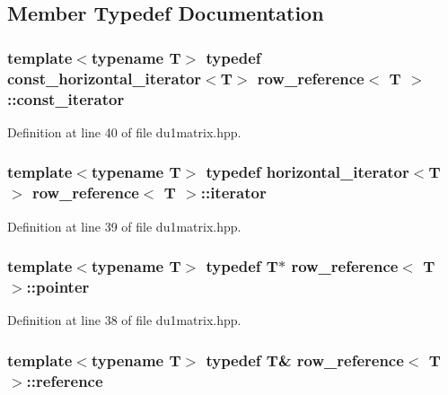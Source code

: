 \subsection{Member Typedef Documentation}
\hypertarget{classrow__reference_a3a005e2f998d46b3718fc09c79066b5e}{
\subsubsection[{const\-\_\-iterator}]{\setlength{\rightskip}{0pt plus 5cm}template$<$typename T$>$ typedef {\bf const\-\_\-horizontal\-\_\-iterator}$<$T$>$ {\bf row\-\_\-reference}$<$ T $>$\-::{\bf const\-\_\-iterator}}}\label{classrow__reference_a3a005e2f998d46b3718fc09c79066b5e}


Definition at line 40 of file du1matrix.\-hpp.

\hypertarget{classrow__reference_a82d976cea237ebb2ddb3be8bd810ffa8}{
\subsubsection[{iterator}]{\setlength{\rightskip}{0pt plus 5cm}template$<$typename T$>$ typedef {\bf horizontal\-\_\-iterator}$<$T$>$ {\bf row\-\_\-reference}$<$ T $>$\-::{\bf iterator}}}\label{classrow__reference_a82d976cea237ebb2ddb3be8bd810ffa8}


Definition at line 39 of file du1matrix.\-hpp.

\hypertarget{classrow__reference_a3f5e136cc45d10f628005e298ca0c724}{
\subsubsection[{pointer}]{\setlength{\rightskip}{0pt plus 5cm}template$<$typename T$>$ typedef T$\ast$ {\bf row\-\_\-reference}$<$ T $>$\-::{\bf pointer}}}\label{classrow__reference_a3f5e136cc45d10f628005e298ca0c724}


Definition at line 38 of file du1matrix.\-hpp.

\hypertarget{classrow__reference_aa9bd9523fa30ad1336ad1327c011dde3}{
\subsubsection[{reference}]{\setlength{\rightskip}{0pt plus 5cm}template$<$typename T$>$ typedef T\& {\bf row\-\_\-reference}$<$ T $>$\-::{\bf reference}}}\label{classrow__reference_aa9bd9523fa30ad1336ad1327c011dde3}


